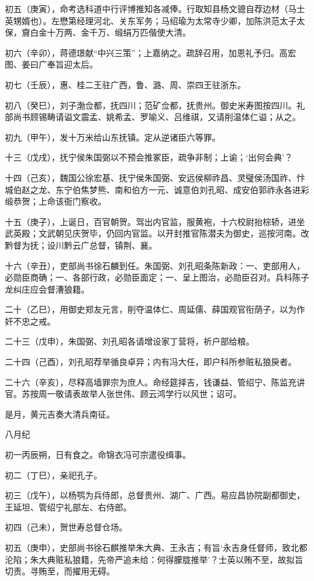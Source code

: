 \documentclass[]{article}
\begin{document}
初五（庚寅），命考选科道中行评博推知各减俸。行取知县杨文骢自荐边材（马士英甥婿也）。左懋第经理河北、关东军务；马绍瑜为太常寺少卿，加陈洪范太子太保，齎白金十万两、金千万、缎绢万匹偕使大清。

初六（辛卯），蒋德璟献``中兴三策''；上嘉纳之。疏辞召用，加恩礼予归。高宏图、姜曰广奉旨迎太后。

初七（壬辰），惠、桂二王驻广西，鲁、潞、周、崇四王驻浙东。

初八（癸巳），刘子渤佥都，抚四川；范矿佥都，抚贵州。御史米寿图按四川。礼部尚书顾锡畴请谥文震孟、姚希孟、罗喻义、吕维祺，又请削温体仁谥；从之。

初九（甲午），发十万米给山东抚镇。定从逆诸臣六等罪。

十三（戊戌），抚宁侯朱国弼以不预会推冢臣，疏争非制；上谕；`出何会典'？

十四（己亥），魏国公徐宏基、抚宁侯朱国弼、安远侯柳祚昌、灵璧侯汤国祚、忭城伯赵之龙、东宁伯焦梦熊、南和伯方一元、诚意伯刘孔昭、成安伯郭祚永各进彩缎恭贺；上命该衙门察收。

十五（庚子），上诞日，百官朝贺。驾出内官监，服黄袍，十六校尉抬棕轿，进坐武英殿；文武朝见庆贺毕，仍回内官监。以开封推官陈潜夫为御史，巡按河南。改黔督为抚；设川黔云广总督，镇荆、襄。

十六（辛丑），吏部尚书徐石麟到任。朱国弼、刘孔昭条陈新政：一、吏部用人，必勋臣商确；一、各部行政，必勋臣面定；一、呈上图治，必勋臣召对。兵科陈子龙纠庄应会督漕狼籍。

二十（乙巳），用御史郑友元言，削夺温体仁、周延儒、薛国观官衔荫子，以为作奸不忠之戒。

二十三（戊申），朱国弼、刘孔昭各请增设家丁营将，祈户部给粮。

二十四（己酉），刘孔昭荐举循良卓异；内有冯大任，即户科所参赃私狼戾者。

二十六（辛亥），尽释高墙罪宗为庶人。命经筵择吉，钱谦益、管绍宁、陈监充讲官。苏按周一敬请表故举人张世伟、顾云鸿学行以风世；诏可。

是月，黄元吉奏大清兵南征。

八月纪

初一丙辰朔，日有食之。命锦衣冯可宗遣役缉事。

初二（丁巳），亲祀孔子。

初三（戊午），以杨鹗为兵侍郎，总督贵州、湖广、广西。易应昌协院副都御史，王延坦、管绍宁礼部左、右侍郎。

初四（己未），贺世寿总督仓场。

初五（庚申），史部尚书徐石麒推举朱大典、王永吉；有旨`永吉身任督师，致北都沦陷；朱大典赃私狼籍，先帝严追未给：何得朦胧推举'？士英以贿不至，故拟旨切责。寻贿至，而擢用无碍。
\end{document}
